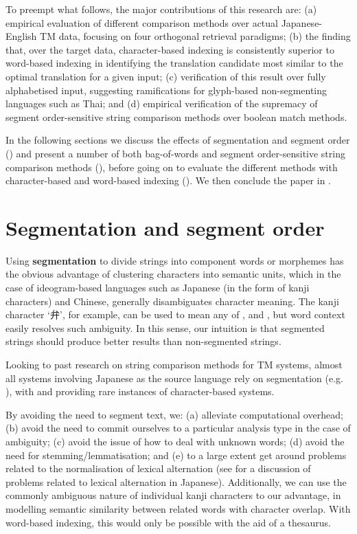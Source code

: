To preempt what follows, the major contributions of this research are:
(a) empirical evaluation of different comparison methods over actual
Japanese-English TM data, focusing on four orthogonal retrieval
paradigms; (b) the finding that, over the target data, character-based
indexing is consistently superior to word-based indexing in identifying
the translation candidate most similar to the optimal translation for a
given input; (c) verification of this result over fully alphabetised
input, suggesting ramifications for glyph-based non-segmenting languages
such as Thai; and (d) empirical verification of the supremacy of segment
order-sensitive string comparison methods over boolean match methods.

In the following sections we discuss the effects of segmentation and
segment order () and present a number of both bag-of-words
and segment order-sensitive string comparison methods (),
before going on to evaluate the different methods with character-based
and word-based indexing ().  We then conclude the
paper in .





\section{Segmentation and segment order}
\label{sec:seg}

Using {\bf segmentation} to divide strings into component words or
morphemes has the obvious advantage of clustering characters into
semantic units, which in the case of ideogram-based languages such as
Japanese (in the form of kanji characters) and Chinese, generally
disambiguates character meaning. The kanji character `弁', for example,
can be used to mean any of ,  and , but word context easily resolves such
ambiguity. In this sense, our intuition is that segmented strings should
produce better results than non-segmented strings.

Looking to past research on string comparison methods for TM systems, almost
all systems involving Japanese as the source language rely on
segmentation (e.g. \cite{Nakamura89,Sumita91,Kitamura96,Tanaka97}), with
 and  providing rare instances of
character-based systems.

By avoiding the need to segment text, we: (a) alleviate computational
overhead; (b) avoid the need to commit ourselves to a particular
analysis type in the case of ambiguity; (c) avoid the issue of how to
deal with unknown words; (d) avoid the need for stemming/lemmatisation;
and (e) to a large extent get around problems related to the
normalisation of lexical alternation (see  for a
discussion of problems related to lexical alternation in
Japanese). Additionally, we can use the commonly ambiguous nature of
individual kanji characters to our advantage, in modelling semantic
similarity between related words with character overlap. With word-based 
indexing, this would only be possible with the aid of a thesaurus.


